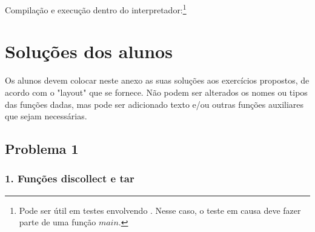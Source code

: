 \documentclass[a4paper]{article}
\newcommand{\Varid}[1]{\mathit{#1}}
\def\resethooks{%
  \global\let\SaveRestoreHook\empty
  \global\let\ColumnHook\empty}
\let\hspre\empty
\let\hspost\empty
\begin{document}
Compilação e execução dentro do interpretador:\footnote{Pode ser útil em testes
envolvendo . Nesse caso, o teste em causa deve fazer parte de uma função
\ensuremath{\Varid{main}}.}
\resethooks


\section{Soluções dos alunos}\label{sec:resolucao}
Os alunos devem colocar neste anexo as suas soluções aos exercícios
propostos, de acordo com o "layout" que se fornece. Não podem ser
alterados os nomes ou tipos das funções dadas, mas pode ser adicionado texto e/ou 
outras funções auxiliares que sejam necessárias.

\subsection*{Problema 1}
\subsubsection*{1. Funções discollect e tar}
\end{document}

